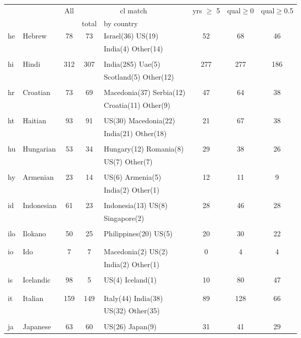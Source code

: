 \begin{figure}[h]
\centering
\begin{tabular}{llcclccc}
&&All&\multicolumn{2}{c}{cl match}&yrs $\geq$ 5&qual$\geq$0&qual$\geq$0.5\\
&&&total&by country&&\\
\hline\hline
he&Hebrew&78&73&Israel(36) US(19) &52&68&46\\
&&&&India(4) Other(14) &&&\\
&&&&&&&\\
hi&Hindi&312&307&India(285) Uae(5) &277&277&186\\
&&&&Scotland(5) Other(12) &&&\\
&&&&&&&\\
hr&Croatian&73&69&Macedonia(37) Serbia(12) &47&64&38\\
&&&&Croatia(11) Other(9) &&&\\
&&&&&&&\\
ht&Haitian&93&91&US(30) Macedonia(22) &21&67&38\\
&&&&India(21) Other(18) &&&\\
&&&&&&&\\
hu&Hungarian&53&34&Hungary(12) Romania(8) &29&38&26\\
&&&&US(7) Other(7) &&&\\
&&&&&&&\\
hy&Armenian&23&14&US(6) Armenia(5) &12&11&9\\
&&&&India(2) Other(1) &&&\\
&&&&&&&\\
id&Indonesian&61&23&Indonesia(13) US(8) &28&46&28\\
&&&&Singapore(2) &&&\\
&&&&&&&\\
ilo&Ilokano&50&25&Philippines(20) US(5) &20&30&22\\
&&&&&&&\\
&&&&&&&\\
io&Ido&7&7&Macedonia(2) US(2) &0&4&4\\
&&&&India(2) Other(1) &&&\\
&&&&&&&\\
is&Icelandic&98&5&US(4) Iceland(1) &10&80&47\\
&&&&&&&\\
&&&&&&&\\
it&Italian&159&149&Italy(44) India(38) &89&128&66\\
&&&&US(32) Other(35) &&&\\
&&&&&&&\\
ja&Japanese&63&60&US(26) Japan(9) &31&41&29\\

\end{tabular}
\end{figure}
